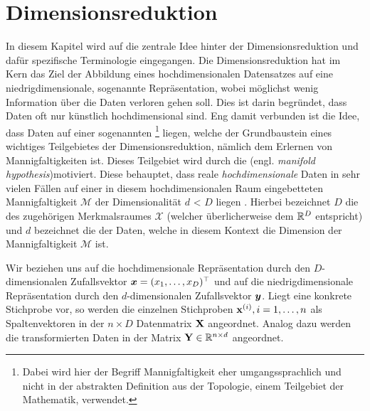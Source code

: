 \chapter{Dimensionsreduktion}
\label{ch:Dimensionsreduktion}

In diesem Kapitel wird auf die zentrale Idee hinter der Dimensionsreduktion und dafür spezifische
Terminologie eingegangen. Die Dimensionsreduktion hat im Kern das Ziel der Abbildung eines
hochdimensionalen Datensatzes auf eine niedrigdimensionale, sogenannte 
Repräsentation, wobei möglichst wenig Information über die Daten verloren gehen soll. Dies ist
darin begründet, dass Daten oft nur künstlich hochdimensional sind. Eng damit verbunden ist die
Idee, dass Daten auf einer sogenannten \footnote{Dabei wird hier der
	Begriff Mannigfaltigkeit eher umgangssprachlich und nicht in der abstrakten Definition aus der
	Topologie, einem Teilgebiet der Mathematik, verwendet.} liegen, welche der Grundbaustein eines
wichtiges Teilgebietes der Dimensionsreduktion, nämlich dem Erlernen von Mannigfaltigkeiten \parencite{Cayton.2005} ist. Dieses Teilgebiet wird durch die 
(engl. \textit{manifold hypothesis})\addref motiviert. Diese behauptet, dass reale
\textit{hochdimensionale} Daten in sehr vielen Fällen auf einer in diesem hochdimensionalen Raum
eingebetteten Mannigfaltigkeit $\mathcal{M}$ der Dimensionalität $d$ < $D$ liegen \parencite[vgl.][1]{Cayton.2005}.  Hierbei
bezeichnet $D$ die  des zugehörigen Merkmalsraumes $\mathcal{X}$
(welcher überlicherweise dem $\mathbb{R}^D$ entspricht) und $d$ bezeichnet die  der Daten, welche in diesem Kontext die Dimension der Mannigfaltigkeit $\mathcal{M}$
ist.

Wir beziehen uns auf die hochdimensionale Repräsentation durch den $D$-dimensionalen Zufallsvektor
$\bm{x} = (x_1, \ldots, x_D)^\top$ und auf die niedrigdimensionale Repräsentation
durch den $d$-dimensionalen Zufallsvektor $\bm{y}$. Liegt eine konkrete Stichprobe vor, so
werden die einzelnen Stichproben $\mathbf{x}^{(i)}, i = 1,\ldots,n$ als Spaltenvektoren in der $n
	\times D$ Datenmatrix $\mathbf{X}$ angeordnet. Analog dazu werden die transformierten Daten in der
Matrix $\mathbf{Y} \in \mathbb{R}^{n \times d}$ angeordnet.

